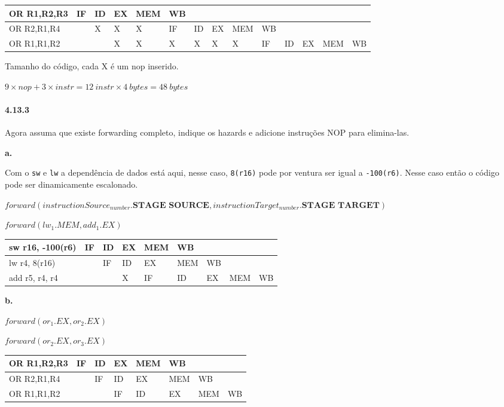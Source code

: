 \documentclass{article}
\begin{document}
\begin{tabular}{|l|l|l|l|l|l|l|l|l|l|l|l|l|l|}
  \hline OR R1,R2,R3 & IF& ID& EX& MEM&  WB&   &   &    &    &   &   &    &   \\
  \hline OR R2,R1,R4 &   &  X&  X&   X&  IF& ID& EX& MEM&  WB&   &   &    &   \\
  \hline OR R1,R1,R2 &   &   &  X&   X&   X&  X&  X&   X&  IF& ID& EX& MEM& WB\\
  \hline
\end{tabular}

Tamanho do código, cada X é um nop inserido.

$9 \times nop + 3 \times instr = 12\ instr \times 4\ bytes = 48\ bytes$

\clearpage
\paragraph{4.13.3} Agora assuma que existe forwarding completo, indique os
hazards e adicione instruções NOP para elimina-las.

\textbf{a.}

Com o \verb|sw| e \verb|lw| a dependência de dados está aqui, nesse caso, \verb|8(r16)| pode 
por ventura ser igual a \verb|-100(r6)|. Nesse caso então o código pode ser dinamicamente 
escalonado.

$forward(instructionSource_{number}.\textbf{STAGE SOURCE}, 
instructionTarget_{number}.\textbf{STAGE TARGET})$

$forward(lw_{1}.MEM, add_{1}.EX)$

\begin{tabular}{|l|l|l|l|l|l|l|l|l|}
\hline sw r16, -100(r6) & IF& ID& EX& MEM&  WB&   &    &   \\
\hline lw r4, 8(r16)    &   & IF& ID&  EX& MEM& WB&    &   \\
\hline add r5, r4, r4   &   &   &  X&  IF&  ID& EX& MEM& WB\\
\hline
\end{tabular}

\textbf{b.}

$forward(or_{1}.EX, or_{2}.EX)$

$forward(or_{2}.EX, or_{3}.EX)$

\begin{tabular}{|l|l|l|l|l|l|l|l|}
  \hline OR R1,R2,R3 & IF& ID& EX& MEM&  WB&    &   \\
  \hline OR R2,R1,R4 &   & IF& ID&  EX& MEM&  WB&   \\
  \hline OR R1,R1,R2 &   &   & IF&  ID&  EX& MEM& WB\\
  \hline
\end{tabular}
\end{document}
